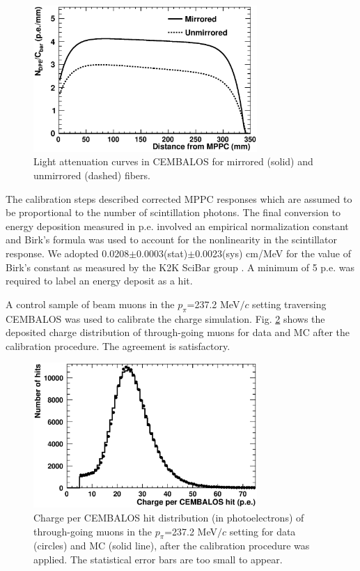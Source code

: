\begin{enumerate}
\begin{figure}[!h]
\begin{center}
\includegraphics[width=85mm]{figures/attcurves_paper.eps}
\caption{Light attenuation curves in CEMBALOS for mirrored (solid) and unmirrored (dashed) fibers.}
\label{fig:attcurves}
\end{center} 
\end{figure}
\end{enumerate}

The calibration steps described corrected MPPC responses which are assumed to be proportional to the number of scintillation photons. The final conversion to energy deposition measured in p.e. involved  an empirical normalization constant and Birk's formula was used to account for the nonlinearity in the scintillator response. We adopted 0.0208$\pm$0.0003(stat)$\pm$0.0023(sys) cm/MeV for the value of Birk's constant as measured by the K2K SciBar group \cite{scibar}. A minimum of 5 p.e. was required to label an energy deposit as a hit.

A control sample of beam muons in the $p_{\pi}$=237.2 MeV$/c$ setting traversing CEMBALOS was used to calibrate the charge simulation. Fig. \ref{fig:muoncharge} shows the deposited charge distribution of through-going muons for data and MC after the calibration procedure. The agreement is satisfactory.

\begin{figure}[!h]
\begin{center}
\includegraphics[width=85mm]{figures/muon_charge_calib.eps}
\caption{Charge per CEMBALOS hit distribution (in photoelectrons) of through-going muons in the $p_{\pi}$=237.2 MeV$/c$ setting for data (circles) and MC (solid line), after the calibration procedure was applied. The statistical error bars are too small to appear.}
\label{fig:muoncharge}
\end{center}
\end{figure}

